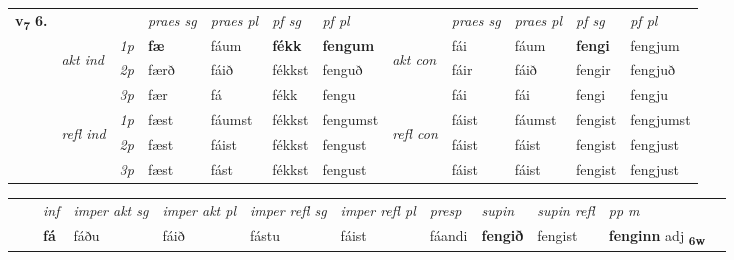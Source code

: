 \begin{tabular}{llllllllllll} \toprule
\multirow{4}{*}{{{\textbf{v{\textsubscript{7}}} \Large{\textbf{6.}}}}}  & &   &  \textit{praes sg}  & \textit{praes pl}  &\textit{ pf sg} & \textit{pf pl} &  &  \textit{praes sg}  & \textit{praes pl}  & \textit{pf sg} & \textit{pf pl } \\*
	\cmidrule{4-7} \cmidrule{9-12}
 & \multirow{3}{*}{\begin{turn}{90}\textit{akt ind}\end{turn}} & {\textit{1p}} & \textbf{fæ} & fáum    & \textbf{fékk} & \textbf{fengum} & \multirow{3}{*}{\begin{turn}{90}\textit{akt con}\end{turn}} &fái & fáum & \textbf{fengi} & fengjum\\*
& &  {\textit{2p}} &  færð  & fáið   & fékkst & fenguð & & fáir & fáið & fengir & fengjuð \\*
& &  {\textit{3p}} & fær & fá   & fékk & fengu & & fái & fái& fengi & fengju  \\*
\cmidrule{4-7} \cmidrule{9-12}
 &\multirow{3}{*}{\begin{turn}{90}\textit{refl ind}\end{turn}} & {\textit{1p}} & fæst & fáumst    & fékkst & fengumst & \multirow{3}{*}{\begin{turn}{90}\textit{refl con}\end{turn}}  &fáist & fáumst & fengist & fengjumst\\*
 &&  {\textit{2p}} &  fæst  & fáist   & fékkst & fengust & &fáist & fáist & fengist & fengjust \\*
& &  {\textit{3p}} & fæst & fást   & fékkst & fengust & & fáist & fáist& fengist & fengjust  \\*
\cmidrule{4-7} \cmidrule{9-12}
\end{tabular}


\begin{tabular}{llllllllllll}
 & & \textit{inf} & \textit{imper akt sg} & \textit{imper akt pl} & \textit{imper refl sg} & \textit{imper refl pl} & \textit{presp} & \textit{supin} & \textit{supin refl} & \textit{pp m}     \\*
  & & \textbf{fá} & fáðu  & fáið & fástu & fáist & fáandi &  \textbf{fengið} & fengist & \textbf{fenginn} adj \textbf{\textsubscript{6w}} \\*
\cmidrule{1-12}
\end{tabular}



